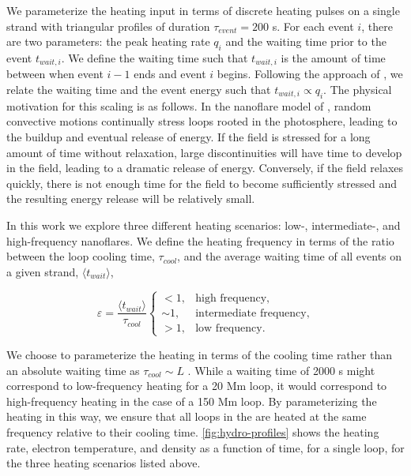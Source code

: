 We parameterize the heating input in terms of discrete heating pulses on a single strand with triangular profiles of duration $\tau_{event}=200$ s. For each event $i$, there are two parameters: the peak heating rate $q_i$ and the waiting time prior to the event $t_{wait,i}$. We define the waiting time such that $t_{wait,i}$ is the amount of time between when event $i-1$ ends and event $i$ begins. Following the approach of \citet{cargill_active_2014}, we relate the waiting time and the event energy such that $t_{wait,i}\propto q_i$. The physical motivation for this scaling is as follows. In the nanoflare model of \citet{parker_nanoflares_1988}, random convective motions continually stress loops rooted in the photosphere, leading to the buildup and eventual release of energy. If the field is stressed for a long amount of time without relaxation, large discontinuities will have time to develop in the field, leading to a dramatic release of energy. Conversely, if the field relaxes quickly, there is not enough time for the field to become sufficiently stressed and the resulting energy release will be relatively small. 

In this work we explore three different heating scenarios: low-, intermediate-, and high-frequency nanoflares. We define the heating frequency in terms of the ratio between the loop cooling time, $\tau_{cool}$, and the average waiting time of all events on a given strand, $\langle t_{wait}\rangle$,

\begin{equation}\label{eq:heating_types}
    \varepsilon = \frac{\langle t_{wait}\rangle}{\tau_{cool}}
    \begin{cases} 
        < 1, &  \text{high frequency},\\
        \sim1, & \text{intermediate frequency}, \\
        > 1, & \text{low frequency}.
     \end{cases}
\end{equation}

We choose to parameterize the heating in terms of the cooling time rather than an absolute waiting time as $\tau_{cool}\sim L$ \citep[see appendix of][]{cargill_active_2014}. While a waiting time of 2000 s might correspond to low-frequency heating for a 20 Mm loop, it would correspond to high-frequency heating in the case of a 150 Mm loop. By parameterizing the heating in this way, we ensure that all loops in the \AR{} are heated at the same frequency relative to their cooling time. \autoref{fig:hydro-profiles} shows the heating rate, electron temperature, and density as a function of time, for a single loop, for the three heating scenarios listed above. 

